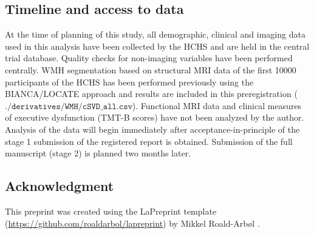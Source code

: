 \subsection{Timeline and access to data}
At the time of planning of this study, all demographic, clinical and imaging data used in this analysis have been collected by the HCHS and are held in the central trial database.
Quality checks for non-imaging variables have been performed centrally.
WMH segmentation based on structural MRI data of the first \num{10000} participants of the HCHS has been performed previously using the BIANCA/LOCATE approach \citep{Rimmele2022-bz} and results are included in this preregistration ($\texttt{./derivatives/WMH/cSVD\_all.csv}$).
Functional MRI data and clinical measures of executive dysfunction (TMT-B scores) have not been analyzed by the author.
Analysis of the data will begin immediately after acceptance-in-principle of the stage 1 submission of the registered report is obtained. Submission of the full manuscript (stage 2) is planned two months later.

\subsection{Acknowledgment}
This preprint was created using the LaPreprint template (\url{https://github.com/roaldarbol/lapreprint}) by Mikkel Roald-Arb\o l \textsuperscript{}.

